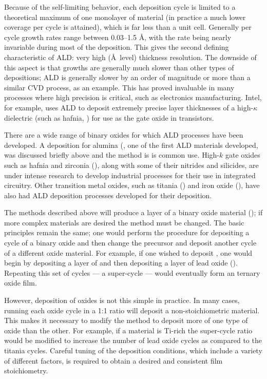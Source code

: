 Because of the self-limiting behavior, each deposition cycle is limited to a theoretical maximum of one monolayer of material (in practice a much lower coverage per cycle is attained), which is far less than a unit cell.\cite{ALD-Handbook} Generally per cycle growth rates range between 0.03--1.5 \AA{}, with the rate being nearly invariable during most of the deposition. This gives the second defining characteristic of ALD: very high (\AA\ level) thickness resolution. The downside of this aspect is that growths are generally much slower than other types of depositions; ALD is generally slower by an order of magnitude or more than a similar CVD process, as an example. This has proved invaluable in many processes where high precision is critical, such as electronics manufacturing. Intel, for example, uses ALD to deposit extremely precise layer thicknesses of a high-$\kappa$ dielectric (such as hafnia, ) for use as the gate oxide in transistors.\cite{toriumi_application_2008,chen_atomic_2007}

There are a wide range of binary oxides for which ALD processes have been developed. A deposition for alumina (, one of the first ALD materials developed, was discussed briefly above and the method is is common use.\cite{lee_al2o3_2003,puurunen_surface_2005} High-$k$ gate oxides such as hafnia and zirconia (), along with some of their nitrides and silicides, are under intense research to develop industrial processes for their use in integrated circuitry.\cite{toriumi_application_2008,chen_atomic_2007} Other transition metal oxides, such as titania () and iron oxide (), have also had ALD deposition processes developed for their deposition. \cite{lim_atomic_2003,scheffe_atomic_2009}

The methods described above will produce a layer of a binary oxide material (); if more complex materials are desired the method must be changed. The basic principles remain the same; one would perform the procedure for depositing a cycle of a binary oxide and then change the precursor and deposit another cycle of a different oxide material. For example, if one wished to deposit \PTO{}, one would begin by depositing a layer of  and then depositing a layer of lead oxide (). Repeating this set of cycles --- a super-cycle --- would eventually form an ternary oxide film. 

However, deposition of  oxides is not this simple in practice. In many cases, running each oxide cycle in a 1:1 ratio will deposit a non-stoichiometric material. This makes it necessary to modify the method to deposit more of one type of oxide than the other. For example, if a material is Ti-rich the super-cycle ratio would be modified to increase the number of lead oxide cycles as compared to the titania cycles. Careful tuning of the deposition conditions, which include a variety of different factors, is required to obtain a desired and consistent film stoichiometry. 

